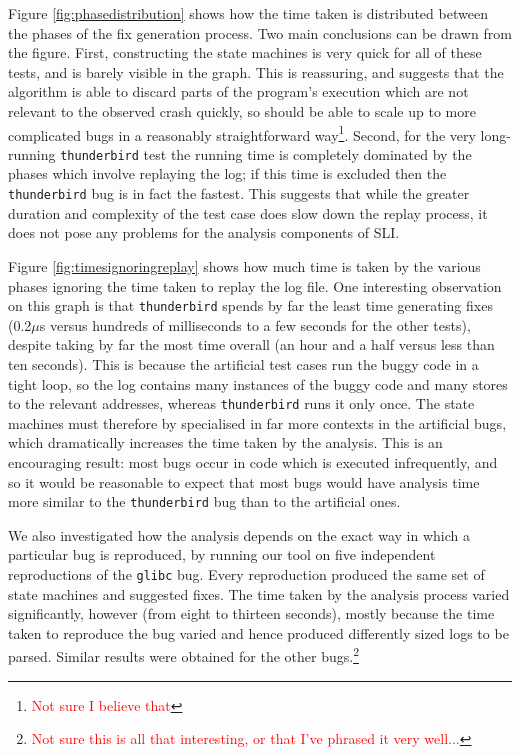 \documentclass[10pt,twocolumn,preprint,natbib,authoryear]{sigplanconf}
\newcommand{\editorial}[1]{\textcolor{red}{\footnote{\textcolor{red}{#1}}}}
\begin{document}
Figure \ref{fig:phasedistribution} shows how the time taken is
distributed between the phases of the fix generation process.  Two
main conclusions can be drawn from the figure.  First, constructing
the state machines is very quick for all of these tests, and is barely
visible in the graph.  This is reassuring, and suggests that the
algorithm is able to discard parts of the program's execution which
are not relevant to the observed crash quickly, so should be able to
scale up to more complicated bugs in a reasonably straightforward
way\editorial{Not sure I believe that}.  Second, for the very
long-running \verb|thunderbird| test the running time is completely
dominated by the phases which involve replaying the log; if this time
is excluded then the \verb|thunderbird| bug is in fact the fastest.
This suggests that while the greater duration and complexity of the
test case does slow down the replay process, it does not pose any
problems for the analysis components of SLI.

Figure \ref{fig:timesignoringreplay} shows how much time is taken by
the various phases ignoring the time taken to replay the log file.
One interesting observation on this graph is that \verb|thunderbird|
spends by far the least time generating fixes (0.2$\mu{}$s versus
hundreds of milliseconds to a few seconds for the other tests),
despite taking by far the most time overall (an hour and a half versus
less than ten seconds).  This is because the artificial test cases run
the buggy code in a tight loop, so the log contains many instances of
the buggy code and many stores to the relevant addresses, whereas
\verb|thunderbird| runs it only once.  The state machines must
therefore by specialised in far more contexts in the artificial bugs,
which dramatically increases the time taken by the analysis.  This is
an encouraging result: most bugs occur in code which is executed
infrequently, and so it would be reasonable to expect that most bugs
would have analysis time more similar to the \verb|thunderbird| bug
than to the artificial ones.

We also investigated how the analysis depends on the exact way in 
which a particular bug is reproduced, by running our tool
on five independent reproductions of the \verb|glibc| bug.  Every
reproduction produced the same set of state machines and suggested
fixes.  The time taken by the analysis process varied significantly,
however (from eight to thirteen seconds), mostly because the time
taken to reproduce the bug varied and hence produced differently sized
logs to be parsed. Similar results were obtained for the other
bugs.\editorial{Not sure this is all that interesting, or that I've
  phrased it very well...}
\end{document}
